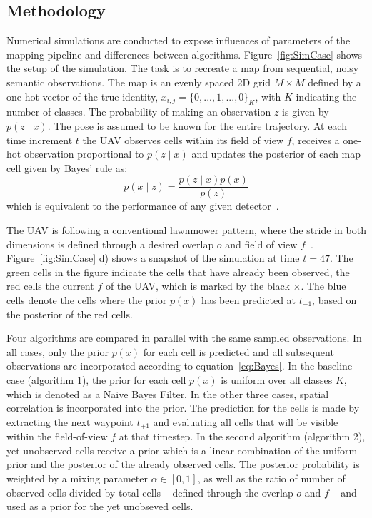 \documentclass[twocolumn,letterpaper]{IEEEAerospaceCLS}  %
\begin{document}
\subsection{Methodology} \label{ssec:SimMet}
Numerical simulations are conducted to expose influences of parameters of the mapping pipeline and differences between algorithms. Figure~\ref{fig:SimCase} shows the setup of the simulation. The task is to recreate a map from sequential, noisy semantic observations. The map is an evenly spaced 2D grid $M \times M$ defined by a one-hot vector of the true identity, $x_{i,j} = \{0,..., 1, ..., 0\}_K$, with $K$ indicating the number of classes. The probability of making an observation $z$ is given by $p(z\mid x)$. The pose is assumed to be known for the entire trajectory. At each time increment $t$ the UAV observes cells within its field of view $f$, receives a one-hot observation proportional to $p(z\mid x)$ and updates the posterior of each map cell given by Bayes' rule as:
\begin{equation} \label{eq:Bayes}
    p(x\mid z) = \frac{p(z\mid x) p(x)}{p(z)}
\end{equation}
which is equivalent to the performance of any given detector~\cite{alom_history_2018}.

The UAV is following a conventional lawnmower pattern, where the stride in both dimensions is defined through a desired overlap $o$ and field of view $f$~\cite{shetty_implementation_2020}. Figure~\ref{fig:SimCase} d) shows a snapshot of the simulation at time $t=47$. The green cells in the figure indicate the cells that have already been observed, the red cells the current $f$ of the UAV, which is marked by the black $\pmb{\times}$. The blue cells denote the cells where the prior $p(x)$ has been predicted at $t_{-1}$, based on the posterior of the red cells.

Four algorithms are compared in parallel with the same sampled observations. In all cases, only the prior $p(x)$ for each cell is predicted and all subsequent observations are incorporated according to equation~\ref{eq:Bayes}. In the baseline case (algorithm 1), the prior for each cell $p(x)$ is uniform over all classes $K$, which is denoted as a Naive Bayes Filter. In the other three cases, spatial correlation is incorporated into the prior. The prediction for the cells is made by extracting the next waypoint $t_{+1}$ and evaluating all cells that will be visible within the field-of-view $f$ at that timestep. In the second algorithm (algorithm 2), yet unobserved cells receive a prior which is a linear combination of the uniform prior and the posterior of the already observed cells. The posterior probability is weighted by a mixing parameter $\alpha \in [0, 1]$, as well as the ratio of number of observed cells divided by total cells -- defined through the overlap $o$ and $f$ -- and used as a prior for the yet unobseved cells.
\end{document}

